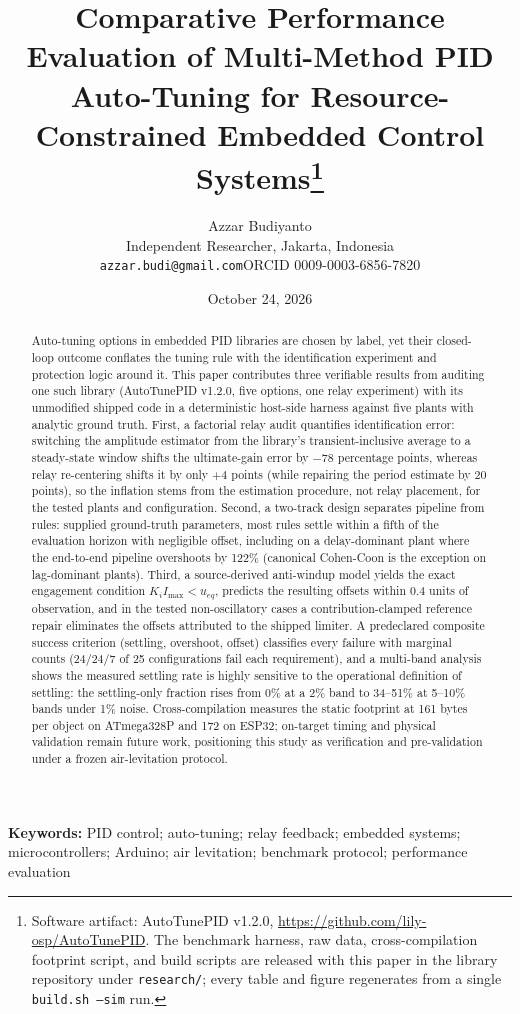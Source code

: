 \documentclass[10pt,twocolumn]{article}
\title{\bfseries Comparative Performance Evaluation of Multi-Method PID Auto-Tuning for Resource-Constrained Embedded Control Systems\thanks{Software artifact: AutoTunePID v1.2.0, \url{https://github.com/lily-osp/AutoTunePID}. The benchmark harness, raw data, cross-compilation footprint script, and build scripts are released with this paper in the library repository under \texttt{research/}; every table and figure regenerates from a single \texttt{build.sh --sim} run.}}
\author{Azzar Budiyanto\\[2pt]
Independent Researcher, Jakarta, Indonesia\\[2pt]
\texttt{azzar.budi@gmail.com}\quad ORCID 0009-0003-6856-7820}
\date{October 24, 2026}
\begin{document}
\maketitle

\begin{abstract}
Auto-tuning options in embedded PID libraries are chosen by label, yet their closed-loop outcome conflates the tuning rule with the identification experiment and protection logic around it. This paper contributes three verifiable results from auditing one such library (AutoTunePID v1.2.0, five options, one relay experiment) with its unmodified shipped code in a deterministic host-side harness against five plants with analytic ground truth. First, a factorial relay audit quantifies identification error: switching the amplitude estimator from the library's transient-inclusive average to a steady-state window shifts the ultimate-gain error by $-78$ percentage points, whereas relay re-centering shifts it by only $+4$ points (while repairing the period estimate by $20$ points), so the inflation stems from the estimation procedure, not relay placement, for the tested plants and configuration. Second, a two-track design separates pipeline from rules: supplied ground-truth parameters, most rules settle within a fifth of the evaluation horizon with negligible offset, including on a delay-dominant plant where the end-to-end pipeline overshoots by 122\% (canonical Cohen-Coon is the exception on lag-dominant plants). Third, a source-derived anti-windup model yields the exact engagement condition $K_i I_{\max} < u_{eq}$, predicts the resulting offsets within 0.4 units of observation, and in the tested non-oscillatory cases a contribution-clamped reference repair eliminates the offsets attributed to the shipped limiter. A predeclared composite success criterion (settling, overshoot, offset) classifies every failure with marginal counts (24/24/7 of 25 configurations fail each requirement), and a multi-band analysis shows the measured settling rate is highly sensitive to the operational definition of settling: the settling-only fraction rises from 0\% at a 2\% band to 34--51\% at 5--10\% bands under 1\% noise. Cross-compilation measures the static footprint at 161 bytes per object on ATmega328P and 172 on ESP32; on-target timing and physical validation remain future work, positioning this study as verification and pre-validation under a frozen air-levitation protocol.
\end{abstract}

\noindent\textbf{Keywords:} PID control; auto-tuning; relay feedback; embedded systems; microcontrollers; Arduino; air levitation; benchmark protocol; performance evaluation
\end{document}
